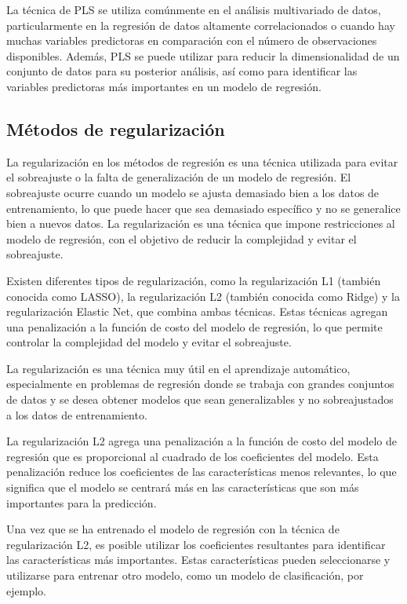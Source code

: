 \documentclass[
  letterpaper,
  DIV=11,
  numbers=noendperiod]{scrartcl}
\begin{document}
La técnica de PLS se utiliza comúnmente en el análisis multivariado de
datos, particularmente en la regresión de datos altamente
correlacionados o cuando hay muchas variables predictoras en comparación
con el número de observaciones disponibles. Además, PLS se puede
utilizar para reducir la dimensionalidad de un conjunto de datos para su
posterior análisis, así como para identificar las variables predictoras
más importantes en un modelo de regresión.

\hypertarget{muxe9todos-de-regularizaciuxf3n}{%
\subsection{Métodos de
regularización}\label{muxe9todos-de-regularizaciuxf3n}}

La regularización en los métodos de regresión es una técnica utilizada
para evitar el sobreajuste o la falta de generalización de un modelo de
regresión. El sobreajuste ocurre cuando un modelo se ajusta demasiado
bien a los datos de entrenamiento, lo que puede hacer que sea demasiado
específico y no se generalice bien a nuevos datos. La regularización es
una técnica que impone restricciones al modelo de regresión, con el
objetivo de reducir la complejidad y evitar el sobreajuste.

Existen diferentes tipos de regularización, como la regularización L1
(también conocida como LASSO), la regularización L2 (también conocida
como Ridge) y la regularización Elastic Net, que combina ambas técnicas.
Estas técnicas agregan una penalización a la función de costo del modelo
de regresión, lo que permite controlar la complejidad del modelo y
evitar el sobreajuste.

La regularización es una técnica muy útil en el aprendizaje automático,
especialmente en problemas de regresión donde se trabaja con grandes
conjuntos de datos y se desea obtener modelos que sean generalizables y
no sobreajustados a los datos de entrenamiento.

La regularización L2 agrega una penalización a la función de costo del
modelo de regresión que es proporcional al cuadrado de los coeficientes
del modelo. Esta penalización reduce los coeficientes de las
características menos relevantes, lo que significa que el modelo se
centrará más en las características que son más importantes para la
predicción.

Una vez que se ha entrenado el modelo de regresión con la técnica de
regularización L2, es posible utilizar los coeficientes resultantes para
identificar las características más importantes. Estas características
pueden seleccionarse y utilizarse para entrenar otro modelo, como un
modelo de clasificación, por ejemplo.
\end{document}
